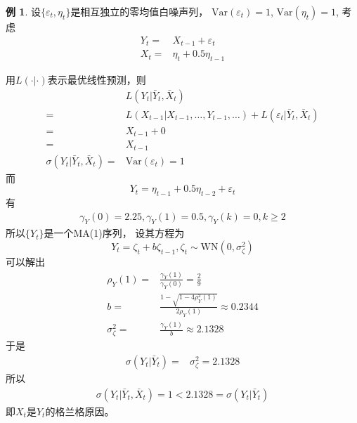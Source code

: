 \documentclass[
]{book}
\theoremstyle{definition}
\theoremstyle{definition}
\newtheorem{example}{例}[chapter]
\theoremstyle{definition}
\theoremstyle{definition}
\theoremstyle{remark}
\begin{document}
\begin{example}
\protect\hypertarget{exm:causal-exaxylag1}{}{\label{exm:causal-exaxylag1} }设\(\{ \varepsilon_t, \eta_t \}\)是相互独立的零均值白噪声列，
\(\text{Var}(\varepsilon_t)=1\),
\(\text{Var}(\eta_t)=1\),
考虑
\[\begin{aligned}
Y_t =& X_{t-1} + \varepsilon_t \\
X_t =& \eta_t + 0.5 \eta_{t-1}
\end{aligned}\]
\end{example}

用\(L(\cdot|\cdot)\)表示最优线性预测，则
\[\begin{aligned}
& L(Y_t | \bar Y_t, \bar X_t) \\
=& L(X_{t-1} | X_{t-1}, \dots, Y_{t-1}, \dots)
+ L(\varepsilon_t | \bar Y_t, \bar X_t) \\
=& X_{t-1} + 0 \\
=& X_{t-1} \\
\sigma(Y_t | \bar Y_t, \bar X_t) =&
\text{Var}(\varepsilon_t) = 1
\end{aligned}\]
而
\[
Y_t = \eta_{t-1} + 0.5\eta_{t-2} + \varepsilon_t
\]
有
\[\begin{aligned}
\gamma_Y(0) = 2.25,
\gamma_Y(1) = 0.5,
\gamma_Y(k) = 0, k \geq 2
\end{aligned}\]
所以\(\{Y_t \}\)是一个MA(1)序列，
设其方程为
\[
Y_t = \zeta_t + b \zeta_{t-1}, 
\zeta_t \sim \text{WN}(0, \sigma_\zeta^2)
\]
可以解出
\[\begin{aligned}
\rho_Y(1) =& \frac{\gamma_Y(1)}{\gamma_Y(0)} = \frac{2}{9} \\
b =& \frac{1 - \sqrt{1 - 4 \rho_Y^2(1)}}{2 \rho_Y(1)}
\approx 0.2344 \\
\sigma_\zeta^2 =& \frac{\gamma_Y(1)}{b} \approx 2.1328
\end{aligned}\]
于是
\[\begin{aligned}
\sigma(Y_t | \bar Y_t)
=& \sigma_\zeta^2 = 2.1328
\end{aligned}\]
所以
\[\begin{aligned}
\sigma(Y_t | \bar Y_t, \bar X_t) = 1
< 2.1328 = \sigma(Y_t | \bar Y_t)
\end{aligned}\]
即\(X_t\)是\(Y_t\)的格兰格原因。
\end{document}
